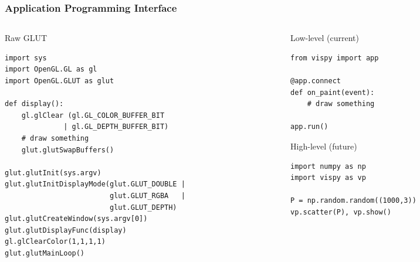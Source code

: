 \documentclass[10pt]{beamer}
\begin{document}
\begin{frame}[fragile]
  \frametitle{Application Programming Interface}
  \begin{columns}
    \begin{column}{.45\textwidth}
      \begin{block}{Raw GLUT}
        \begin{lstlisting}[basicstyle=\tiny\ttfamily]
import sys
import OpenGL.GL as gl
import OpenGL.GLUT as glut

def display():
    gl.glClear (gl.GL_COLOR_BUFFER_BIT
              | gl.GL_DEPTH_BUFFER_BIT)
    # draw something
    glut.glutSwapBuffers()

glut.glutInit(sys.argv)
glut.glutInitDisplayMode(glut.GLUT_DOUBLE |
                         glut.GLUT_RGBA   |
                         glut.GLUT_DEPTH)
glut.glutCreateWindow(sys.argv[0])
glut.glutDisplayFunc(display)
gl.glClearColor(1,1,1,1)
glut.glutMainLoop()
        \end{lstlisting}
      \end{block}
    \end{column}
    \begin{column}{.45\textwidth}
      \begin{block}{Low-level (current)}
        \begin{lstlisting}
from vispy import app

@app.connect
def on_paint(event):
    # draw something

app.run()
        \end{lstlisting}
      \end{block}
      \begin{block}{High-level (future)}
        \begin{lstlisting}
import numpy as np
import vispy as vp

P = np.random.random((1000,3))
vp.scatter(P), vp.show()
        \end{lstlisting}
      \end{block}
    \end{column}
  \end{columns}

\end{frame}
\end{document}
